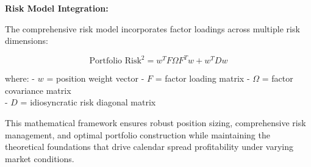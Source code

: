 \documentclass[
  american,
  11pt,
  11pt,
  letterpaper,
  onecolumn]{article}
\begin{document}
\textbf{Risk Model Integration:}

The comprehensive risk model incorporates factor loadings across
multiple risk dimensions:

\[\text{Portfolio Risk}^2 = w^T F \Omega F^T w + w^T D w\]

where: - \(w\) = position weight vector - \(F\) = factor loading matrix
- \(Ω\) = factor covariance matrix\\
- \(D\) = idiosyncratic risk diagonal matrix

This mathematical framework ensures robust position sizing,
comprehensive risk management, and optimal portfolio construction while
maintaining the theoretical foundations that drive calendar spread
profitability under varying market conditions.


\printbibliography
\end{document}

